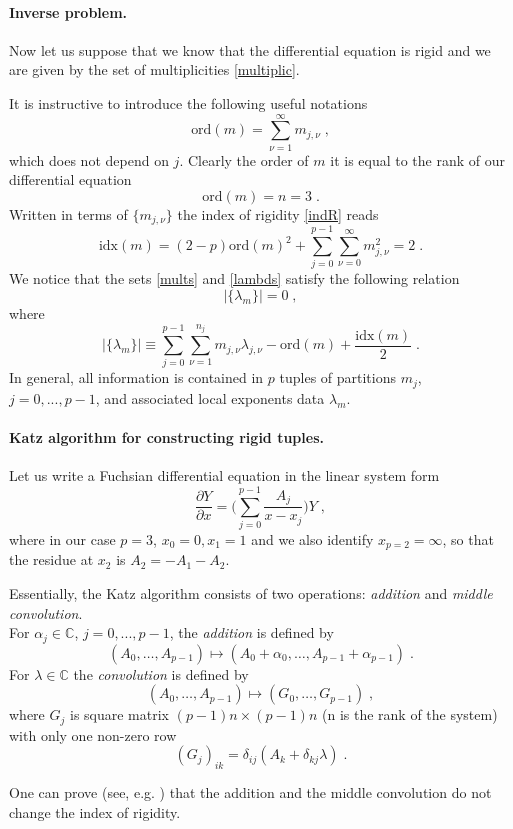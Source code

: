 \documentclass[12pt,a4paper]{article}
\def\be{\begin{equation}}
\def\ee{\end{equation}}
\newcommand{\< }{{\langle}}
\renewcommand{\>}{{\rangle}}
\newcommand{\0}{\textbf{0.}}
\newcommand{\1}{\textbf{1.}}
\newcommand{\2}{\textbf{2.}}
\newcommand{\3}{\textbf{3.}}
\newcommand{\4}{\textbf{4.}}
\newcommand{\5}{\textbf{5.}}
\newcommand{\6}{\textbf{6.}}
\newcommand{\7}{\textbf{7.}}
\newcommand{\8}{\textbf{8.}}
\newcommand{\9}{\textbf{9.}}
\begin{document}
\paragraph{Inverse problem.} Now let us suppose that we know that the differential equation is rigid and we are given by the set of multiplicities \eqref{multiplic}.

It is instructive to introduce the following useful notations 
\be
\text{ord}(m)=\sum_{\nu=1}^\infty m_{j,\nu}\;,
\ee
which does not depend on $j$. Clearly  the order of $m$ it is equal to the rank of our differential equation 
\be 
\text{ord}(m)=n=3\;.
\ee 
Written in terms 
of $\{m_{j,\nu}\}$ the index of rigidity \eqref{indR} reads 
\be\label{indR1}
\text{idx}(m) =(2-p) \text{ord}(m)^2 +\sum_{j=0}^{p-1}\sum_{\nu=0}^\infty m_{j,\nu}^2=2\;.
\ee
We notice that the sets \eqref{mults} and \eqref{lambds} satisfy the following relation
\be
|\{\lambda_m\}|=0\;,
\ee
where
\be
|\{\lambda_m\}|\equiv
\sum_{j=0}^{p-1}\sum_{\nu=1}^{n_j} m_{j,\nu}\lambda_{j,\nu}-\text{ord}(m)+\frac{\text{idx}(m)}{2}\;.
\ee
In general, all information is contained in $p$ tuples of partitions $m_j$, $j=0,...,p-1$, and associated local exponents data $\lambda_m$.

\paragraph{Katz algorithm for constructing rigid tuples.} 
Let us write a Fuchsian differential equation in the linear system form
\be
\frac{\partial Y}{\partial x}=
\bigg(\sum_{j=0}^{p-1} \frac{A_j}{x-x_j}\bigg)Y\;,
\ee
where in our case $p=3$, $x_0=0, x_1=1$ and we also identify $x_{p=2}=\infty$, so that the residue at $x_2$ is $A_2=-A_1-A_2$.

Essentially, the  Katz algorithm consists of two operations:
{\it addition} and {\it middle convolution}.\\
For $\alpha_j\in\mathbb{C}$, $j=0,...,p-1$,  the {\it addition} is defined by
\be
(A_0,\dots, A_{p-1})\mapsto (A_0+\alpha_{0},\dots, A_{p-1}+\alpha_{p-1})\;.
\ee
For $\lambda\in\mathbb{C}$ the {\it convolution} is defined by
\be
(A_0,\dots, A_{p-1})\mapsto (G_0,\dots, G_{p-1})\;,
\ee
where $G_j$ is square matrix $(p-1) n \times (p-1) n$ (n is the rank of the system)
with only one non-zero row
\be
(G_j)_{ik}=\delta_{ij} (A_k+\delta_{kj} \lambda)\;.
\ee

One can prove (see, e.g. \cite{oshima}) that the addition and the middle convolution do not change the index of rigidity.
 
\end{document}
